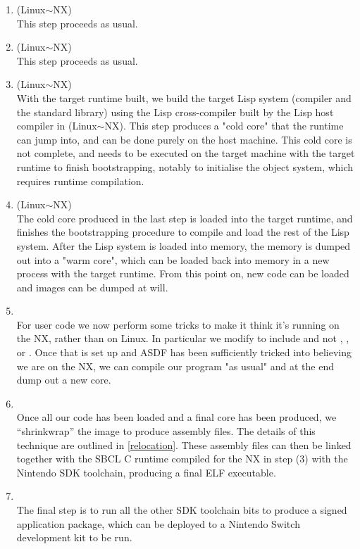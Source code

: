 \documentclass[format=sigconf]{acmart}
\begin{document}
\begin{enumerate}
\item {} (Linux$\sim$NX) \\
  This step proceeds as usual.
\item {} (Linux$\sim$NX) \\
  This step proceeds as usual.
\item {} (Linux$\sim$NX) \\
  With the target runtime built, we build the target Lisp system (compiler and the standard library) using the Lisp cross-compiler built by the Lisp host compiler in  (Linux$\sim$NX). This step produces a "cold core" that the runtime can jump into, and can be done purely on the host machine. This cold core is not complete, and needs to be executed on the target machine with the target runtime to finish bootstrapping, notably to initialise the object system, which requires runtime compilation.
\item {} (Linux$\sim$NX) \\
  The cold core produced in the last step is loaded into the target runtime, and finishes the bootstrapping procedure to compile and load the rest of the Lisp system. After the Lisp system is loaded into memory, the memory is dumped out into a "warm core", which can be loaded back into memory in a new process with the target runtime. From this point on, new code can be loaded and images can be dumped at will.
\item {} \\
  For user code we now perform some tricks to make it think it's running on the NX, rather than on Linux. In particular we modify  to include  and not , , or . Once that is set up and ASDF has been sufficiently tricked into believing we are on the NX, we can compile our program "as usual" and at the end dump out a new core.
\item {} \\
  Once all our code has been loaded and a final core has been produced, we ``shrinkwrap'' the image to produce assembly files. The details of this technique are outlined in \autoref{relocation}. These assembly files can then be linked together with the SBCL C runtime compiled for the NX in step (3) with the Nintendo SDK toolchain, producing a final ELF executable.
\item {} \\
  The final step is to run all the other SDK toolchain bits to produce a signed application package, which can be deployed to a Nintendo Switch development kit to be run.
\end{enumerate}
\end{document}
